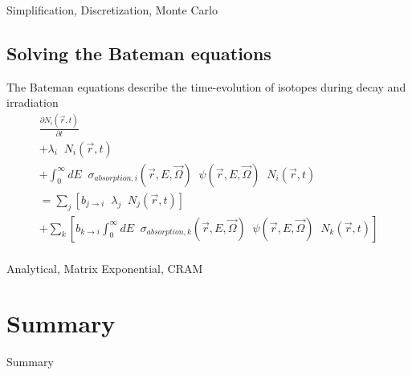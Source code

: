 \documentclass{beamer}
\begin{document}
        \begin{frame}{Simplification, Discretization, Monte Carlo}
        \end{frame}

    \subsection{Solving the Bateman equations}

        \begin{frame}{The Bateman equations describe the time-evolution of isotopes during decay and irradiation}
            \begin{equation*}
                \begin{split}
                    \frac{\partial N_i(\vec r, t)}{\partial t} \\
                    + \lambda_i \; \; N_i(\vec r, t) \\
                    + \int_0^\infty \! \! \! \! dE \; \; \sigma_{absorption,i} ( \vec r, E, \vec\Omega) \; \; \psi(\vec r, E, \vec \Omega) \; \; N_i(\vec r, t) \\
                    = \sum_j \left[ b_{j \rightarrow i} \; \; \lambda_j \; \; N_j(\vec r, t) \right] \\
                    + \sum_k \left[ b_{k \rightarrow i} \int_0^\infty \! \! \! \! dE \; \; \sigma_{absorption,k} ( \vec r, E, \vec\Omega) \; \; \psi(\vec r, E, \vec \Omega) \; \; N_k(\vec r, t) \right] \\
                \end{split}
            \end{equation*}
        \end{frame}

        \begin{frame}{Analytical, Matrix Exponential, CRAM}
        \end{frame}

\section*{Summary}

    \begin{frame}{Summary}
    \end{frame}
\end{document}
